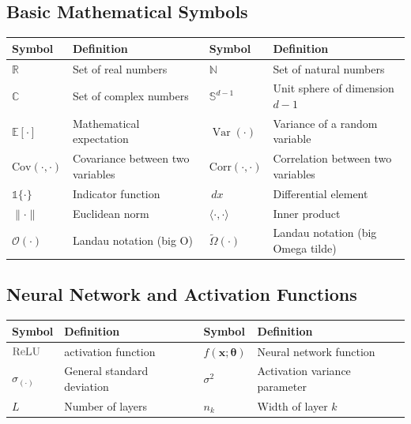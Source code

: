 \documentclass[a4paper]{article}
\newcommand{\Cov}{\text{Cov}}
\newcommand{\Corr}{\text{Corr}}
\newcommand{\ReLU}{\textcolor{relucolor}{\text{ReLU}}}
\DeclareRobustCommand{\ReLU}{\mathrel{\text{%
    \begin{tikzpicture}[baseline=(current bounding box.south)]
        \draw[thick] (0,0) -- (0.25,0) -- (0.4,0.25);
    \end{tikzpicture}}}\!\!}
\newcommand{\E}{\mathbb{E}}
\DeclareMathOperator{\Var}{Var}
\newcommand{\indic}{\mathbb{1}}
\newcommand{\dd}{\,d}
\newcommand{\E}{\mathbb{E}}
\DeclareMathOperator{\Var}{Var}
\newcommand{\indic}{\mathbb{1}}
\newcommand{\dd}{\,d}
\theoremstyle{plain}
\theoremstyle{definition}
\theoremstyle{remark}
\begin{document}
\begin{tcolorbox}[colback=blue!5,colframe=blue!50!black,title={\large \textbf{Mathematical Notation Reference}},enhanced,drop shadow]

\subsection*{Basic Mathematical Symbols}
\begin{longtable}{p{}p{}p{}p{}}
\toprule
\textbf{Symbol} & \textbf{Definition} & \textbf{Symbol} & \textbf{Definition} \\
\midrule
$\mathbb{R}$ & Set of real numbers & $\mathbb{N}$ & Set of natural numbers \\
$\mathbb{C}$ & Set of complex numbers & $\mathbb{S}^{d-1}$ & Unit sphere of dimension $d-1$ \\
$\E[\cdot]$ & Mathematical expectation & $\Var(\cdot)$ & Variance of a random variable \\
$\Cov(\cdot,\cdot)$ & Covariance between two variables & $\Corr(\cdot,\cdot)$ & Correlation between two variables \\
$\indic\{\cdot\}$ & Indicator function & $\dd x$ & Differential element \\
$\|\cdot\|$ & Euclidean norm & $\langle \cdot,\cdot \rangle$ & Inner product \\
$\mathcal{O}(\cdot)$ & Landau notation (big O) & $\tilde{\Omega}(\cdot)$ & Landau notation (big Omega tilde) \\
\bottomrule
\end{longtable}

\subsection*{Neural Network and Activation Functions}
\begin{longtable}{p{}p{}p{}p{}}
\toprule
\textbf{Symbol} & \textbf{Definition} & \textbf{Symbol} & \textbf{Definition} \\
\midrule
$\ReLU$ & activation function & $f(\mathbf{x}; \boldsymbol{\theta})$ & Neural network function \\
$\sigma_{(\cdot)}$ & General standard deviation & $\sigma^2$ & Activation variance parameter \\
$L$ & Number of layers & $n_k$ & Width of layer $k$ \\
\bottomrule
\end{longtable}


\end{tcolorbox}
\end{document}

